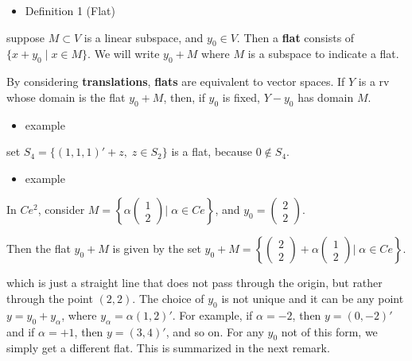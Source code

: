 \documentclass[
]{book}
\providecommand{\tightlist}{%
  \setlength{\itemsep}{0pt}\setlength{\parskip}{0pt}}
\begin{document}
{{{\begin{itemize}
\tightlist
\item
  Definition 1 (Flat)
\end{itemize}

suppose \(M \subset V\) is a linear subspace, and \(y_0 \in V\). Then a \textbf{flat} consists of \(\{x + y_0 \; \Big \vert \; x \in M\}\). We will write \(y_0 +M\) where \(M\) is a subspace to indicate a flat.

By considering \textbf{translations}, \textbf{flats} are equivalent to vector spaces. If \(Y\) is a rv whose domain is the flat \(y_0 +M\), then, if \(y_0\) is fixed, \(Y-y_0\) has domain \(M\).

\begin{itemize}
\tightlist
\item
  example
\end{itemize}

set \(S_4 = \{(1,1,1)' + z, \; z \in S_2\}\) is a flat, because \(0 \not \in S_4\).

\begin{itemize}
\tightlist
\item
  example
\end{itemize}

In \(C e^2\), consider \(M= \left \{ \alpha \begin{pmatrix} 1 \\ 2 \end{pmatrix} \Bigg \vert \; \alpha \in C e \right\}\), and \(y_0 = \begin{pmatrix} 2 \\ 2 \end{pmatrix}\).

Then the flat \(y_0 + M\) is given by the set \(y_0 + M= \left \{ \begin{pmatrix} 2 \\ 2 \end{pmatrix} + \alpha \begin{pmatrix} 1 \\ 2 \end{pmatrix} \Bigg \vert \; \alpha \in C e \right\}\).

which is just a straight line that does not pass through the origin, but rather through the point \((2,2)\). The choice of \(y_0\) is not unique and it can be any point \(y=y_0 + y_\alpha\), where \(y_\alpha = \alpha(1,2)'\). For example, if \(\alpha = -2\), then \(y=(0,-2)'\) and if \(\alpha=+1\), then \(y=(3,4)'\), and so on. For any \(y_0\) not of this form, we simply get a different flat. This is summarized in the next remark.

}}}
\end{document}

